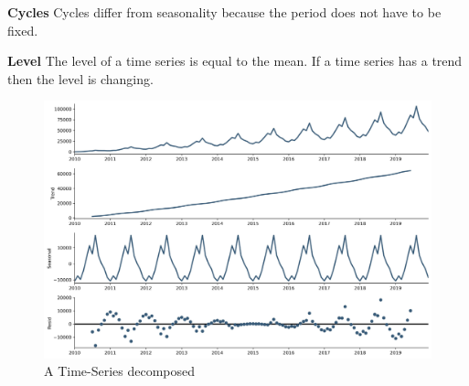 \textbf{Cycles}
Cycles differ from seasonality because the period does not have to be fixed.


\textbf{Level}
The level of a time series is equal to the mean. If a time series has a trend
then the level is changing.



\begin{figure}[h!]
    \centering
    \caption{A Time-Series decomposed}
    \label{fig:example-time-series-decomposed}
    \includegraphics[width=\textwidth]{./figs/illustrations/time-series_example-decomposed.png}
    \hfill
\end{figure}